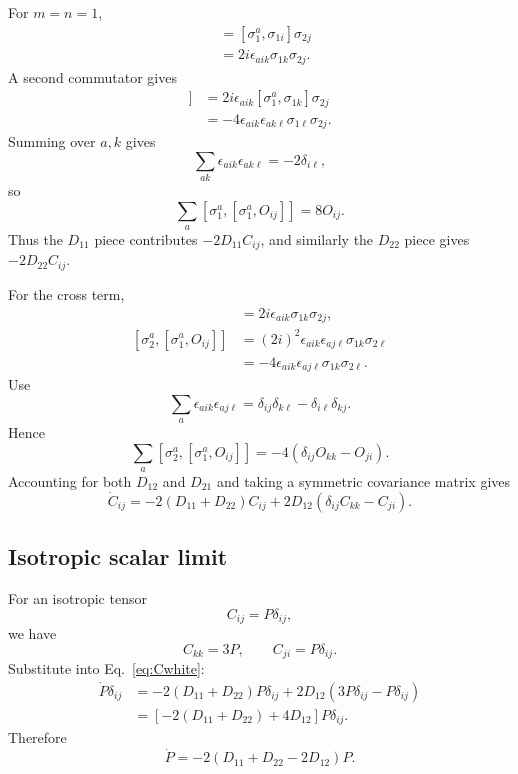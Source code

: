 \documentclass[11pt]{article}
\newcommand{\eps}{\epsilon}
\begin{document}
For $m=n=1$,
\begin{align}
[\sigma_1^a,O_{ij}]
&=[\sigma_1^a,\sigma_{1i}]\sigma_{2j}\\
&=2i\eps_{aik}\sigma_{1k}\sigma_{2j}.
\end{align}
A second commutator gives
\begin{align}
[\sigma_1^a,[\sigma_1^a,O_{ij}]]
&=2i\eps_{aik}[\sigma_1^a,\sigma_{1k}]\sigma_{2j}\\
&=-4\eps_{aik}\eps_{ak\ell}\sigma_{1\ell}\sigma_{2j}.
\end{align}
Summing over $a,k$ gives
\begin{equation}
\sum_{ak}\eps_{aik}\eps_{ak\ell}=-2\delta_{i\ell},
\end{equation}
so
\begin{equation}
\sum_a[\sigma_1^a,[\sigma_1^a,O_{ij}]]=8O_{ij}.
\end{equation}
Thus the $D_{11}$ piece contributes $-2D_{11}C_{ij}$, and similarly the $D_{22}$ piece gives $-2D_{22}C_{ij}$.

For the cross term,
\begin{align}
[\sigma_1^a,O_{ij}]&=2i\eps_{aik}\sigma_{1k}\sigma_{2j},\\
[\sigma_2^a,[\sigma_1^a,O_{ij}]]
&=(2i)^2\eps_{aik}\eps_{aj\ell}\sigma_{1k}\sigma_{2\ell}\\
&=-4\eps_{aik}\eps_{aj\ell}\sigma_{1k}\sigma_{2\ell}.
\end{align}
Use
\begin{equation}
\sum_a\eps_{aik}\eps_{aj\ell}
=\delta_{ij}\delta_{k\ell}-\delta_{i\ell}\delta_{kj}.
\end{equation}
Hence
\begin{equation}
\sum_a[\sigma_2^a,[\sigma_1^a,O_{ij}]]
=-4(\delta_{ij}O_{kk}-O_{ji}).
\end{equation}
Accounting for both $D_{12}$ and $D_{21}$ and taking a symmetric covariance matrix gives
\begin{equation}
\boxed{
\dot C_{ij}
=-2(D_{11}+D_{22})C_{ij}
+2D_{12}(\delta_{ij}C_{kk}-C_{ji}).
}
\label{eq:Cwhite}
\end{equation}

\subsection{Isotropic scalar limit}

For an isotropic tensor
\begin{equation}
C_{ij}=P\delta_{ij},
\end{equation}
we have
\begin{equation}
C_{kk}=3P,
\qquad
C_{ji}=P\delta_{ij}.
\end{equation}
Substitute into Eq.~\eqref{eq:Cwhite}:
\begin{align}
\dot P\delta_{ij}
&=-2(D_{11}+D_{22})P\delta_{ij}
+2D_{12}(3P\delta_{ij}-P\delta_{ij})\\
&=\left[-2(D_{11}+D_{22})+4D_{12}\right]P\delta_{ij}.
\end{align}
Therefore
\begin{equation}
\boxed{
\dot P
=-2(D_{11}+D_{22}-2D_{12})P.
}
\label{eq:Pwhitegeneral}
\end{equation}
\end{document}
